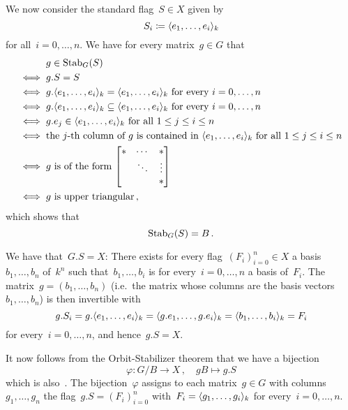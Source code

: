 We now consider the standard flag~$S \in X$ given by
\[
            S_i
  \coloneqq  \langle e_1, \dotsc, e_i\rangle_k
\]
for all~$i = 0, \dotsc, n$.
We have for every matrix~$g \in G$ that
\begingroup
\allowdisplaybreaks
\begin{align*}
      {}& g \in \Stab_G(S) \\
  \iff{}& g.S = S \\
  \iff{}& \text{$g.\gen{e_1, \dotsc, e_i}_k = \gen{e_1, \dotsc, e_i}_k$ for every~$i = 0, \dotsc, n$} \\
  \iff{}& \text{$g.\gen{e_1, \dotsc, e_i}_k \subseteq \gen{e_1, \dotsc, e_i}_k$ for every~$i = 0, \dotsc, n$} \\
  \iff{}& \text{$g.e_j \in \gen{e_1, \dotsc, e_i}_k$ for all~$1 \leq j \leq i \leq n$} \\
  \iff{}& \text{the~\dash{$j$}{th} column of~$g$ is contained in~$\gen{e_1, \dotsc, e_i}_k$ for all~$1 \leq j \leq i \leq n$}  \\
  \iff{}& \text{$g$ is of the form
            $
            \begin{bmatrix}
              * & \cdots  & *       \\
                & \ddots  & \vdots  \\
                &         & *
             \end{bmatrix}
            $
          } \\
  \iff{}& \text{$g$ is upper triangular} \,,
\end{align*}
\endgroup
which shows that
\[
    \operatorname{Stab}_G(S)
  = B \,.
\]

We have that~$G.S = X$:
There exists for every flag~$(F_i)_{i=0}^n \in X$ a basis~$b_1, \dotsc, b_n$ of~$k^n$ such that~$b_1, \dotsc, b_i$ is for every~$i = 0, \dotsc, n$ a basis of~$F_i$.
The matrix~$g = (b_1, \dotsc, b_n)$ (i.e.\ the matrix whose columns are the basis vectors~$b_1, \dotsc, b_n$) is then invertible with
\[
    g.S_i
  = g.\langle e_1, \dotsc, e_i\rangle_k
  = \langle g.e_1, \dotsc, g.e_i\rangle_k
  = \langle b_1, \dotsc, b_i\rangle_k
  = F_i
\]
for every~$i = 0, \dotsc, n$, and hence~$g.S = X$.

It now follows from the Orbit-Stabilizer theorem that we have a bijection
\[
          \varphi
  \colon  G/B
  \to     X \,,
  \quad   gB
  \mapsto g.S
\]
which is also~.
The bijection~$\varphi$ assigns to each matrix~$g \in G$ with columns~$g_1, \dotsc, g_n$ the flag~$g.S = (F_i)_{i=0}^n$ with~$F_i = \langle g_1, \dotsc, g_i\rangle_k$ for every~$i = 0, \dotsc, n$.





